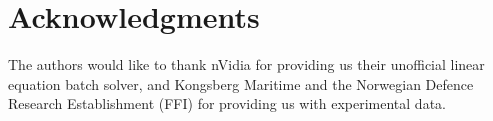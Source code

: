 \documentclass[10pt,a4paper]{article}
\newcommand\1{\vec 1}
\begin{document}




\section*{Acknowledgments}

The authors would like to thank nVidia for providing us their unofficial linear equation batch solver, and Kongsberg Maritime and the Norwegian Defence Research Establishment (FFI) for providing us with experimental data.




\end{document}
